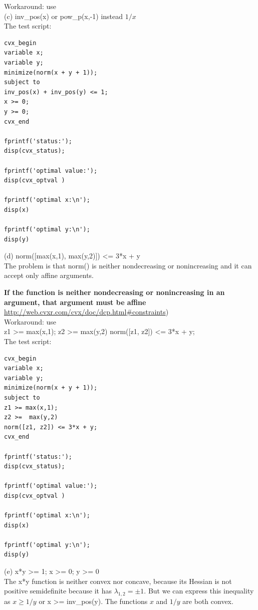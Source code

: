 \documentclass{article}
\begin{document}
Workaround: use \\
(c) inv\_pos(x) or pow\_p(x,-1) instead $1/x$ \\

The test script: \\
\begin{verbatim}
cvx_begin
variable x;
variable y;
minimize(norm(x + y + 1));
subject to
inv_pos(x) + inv_pos(y) <= 1; 
x >= 0; 
y >= 0;
cvx_end

fprintf('status:'); 
disp(cvx_status);

fprintf('optimal value:'); 
disp(cvx_optval )

fprintf('optimal x:\n'); 
disp(x)

fprintf('optimal y:\n'); 
disp(y)
\end{verbatim}

(d) norm([max(x,1), max(y,2)]) \textless= 3*x + y\\

The problem is that norm() is neither nondecreasing or nonincreasing and it can accept only affine arguments.

{\bf If the function is neither nondecreasing or nonincreasing in an argument, that argument must be affine}
\\
\url{http://web.cvxr.com/cvx/doc/dcp.html#constraints})
\\

Workaround: use \\
z1 \textgreater= max(x,1);
z2 \textgreater=  max(y,2)
norm([z1, z2]) \textless= 3*x + y;\\

The test script:
\begin{verbatim}
cvx_begin
variable x;
variable y;
minimize(norm(x + y + 1));
subject to
z1 >= max(x,1);
z2 >=  max(y,2)
norm([z1, z2]) <= 3*x + y;
cvx_end

fprintf('status:'); 
disp(cvx_status);

fprintf('optimal value:'); 
disp(cvx_optval )

fprintf('optimal x:\n'); 
disp(x)

fprintf('optimal y:\n'); 
disp(y)
\end{verbatim}

(e) x*y \textgreater= 1; x \textgreater= 0; 
y \textgreater= 0\\

The x*y function is neither convex nor concave, because its Hessian is not positive semidefinite because 
it has $\lambda_{1, 2} = \pm 1 $. But we can express this inequality as  $x \geq 1 / y$ 
or x \textgreater= inv\_pos(y).  
The functions $x$ and $1/y$ are both convex.
\end{document}
